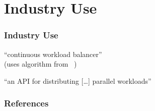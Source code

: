 \documentclass[
]{beamer}
\begin{document}
\section{Industry Use}
\begin{frame}
  \frametitle{Industry Use}
  \begin{description}[<+->]
  \item[BalanceMQ] \autocite{gh:balancemq}
    \enquote{continuous workload balancer} \\
    (uses algorithm from \citeauthor{lafon:balanceMQ}~\autocite{lafon:balanceMQ})
  \item[libcircle] \autocite{gh:libcircle}
    \enquote{an API for distributing [\dots] parallel workloads}
  \item[Mobile Networks] \autocite{ex:mobile3,ex:mobile2,ex:mobile1}
  \end{description}
\end{frame}
\begin{frame}
  \frametitle{References}
  \renewcommand*\bibfont{\tiny}
  \printbibliography
\end{frame}
\end{document}
